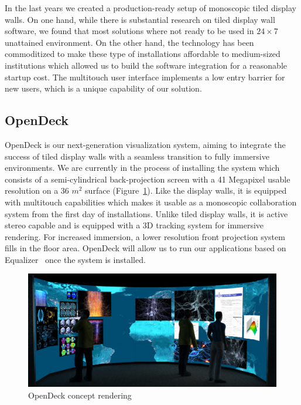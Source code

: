 \documentclass[10pt]{llncs}
\newcommand{\fig}[1]{Figure~\ref{#1}}
\begin{document}
In the last years we created a production-ready setup of monoscopic tiled
display walls. On one hand, while there is substantial research on tiled display
wall software, we found that most solutions where not ready to be used in
$24\times 7$ unattained environment. On the other hand, the technology has been
commoditized to make these type of installations affordable to medium-sized
institutions which allowed us to build the software integration for a reasonable
startup cost. The multitouch user interface implements a low entry barrier for
new users, which is a unique capability of our solution.

\subsection{OpenDeck}

OpenDeck is our next-generation visualization system, aiming to integrate the
success of tiled display walls with a seamless transition to fully immersive
environments. We are currently in the process of installing the system which
consists of a semi-cylindrical back-projection screen with a 41 Megapixel usable
resolution on a 36 $m^2$ surface (\fig{fOpenDeck}). Like the display walls, it
is equipped with multitouch capabilities which makes it usable as a monoscopic
collaboration system from the first day of installations. Unlike tiled display
walls, it is active stereo capable and is equipped with a 3D tracking system for
immersive rendering. For increased immersion, a lower resolution front
projection system fills in the floor area. OpenDeck will allow us to run our
applications based on Equalizer~\cite{EMP:09} once the system is installed.

\begin{figure}[h!t]
  \includegraphics[width=\columnwidth]{images/opendeck}
  \caption{\label{fOpenDeck}OpenDeck concept rendering}
\end{figure}
\end{document}
